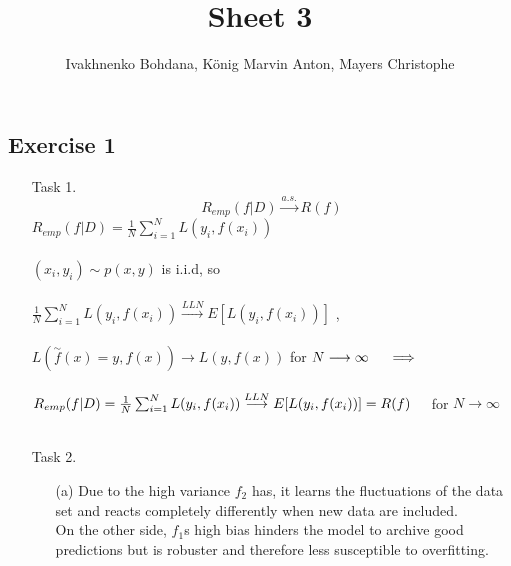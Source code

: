 \documentclass[12pt]{article}
\title{ Sheet 3 }
\author{Ivakhnenko Bohdana, König Marvin Anton, Mayers Christophe}
\begin{document}
\maketitle

\vspace{0.5in}



\subsection*{Exercise 1}
\begin{itemize}

\item[Task 1.] 
\[
R_{emp}(f|D) \overset{a. s.}{\longrightarrow} R(f)
\]
$R_{emp}(f|D) = \frac{1}{N} \sum_{i=1}^NL(y_i, f(x_i))$\\\\
$(x_i,y_i)\sim p(x,y)$ is i.i.d, so\\\\
$\frac{1}{N}\sum_{i=1}^NL(y_i, f(x_i))\overset{LLN}{\longrightarrow}E[L(y_i, f(x_i))]$ ,\\\\  $L(\overset{\sim}{f}(x) = y, f(x)) \longrightarrow L(y, f(x))$ \hspace{0.5cm}for $N \longrightarrow \infty \hspace{0.5cm} \Longrightarrow$ \\\\
$R_{emp}(f|D) = \frac{1}{N} \sum_{i=1}^NL(y_i, f(x_i)) \overset{LLN}{\longrightarrow} E[L(y_i, f(x_i))] = R(f) \hspace{0.5cm} $for $ N \longrightarrow \infty $
\\\\
\item[Task 2.] 
\begin{itemize}
\item[(a)] Due to the high variance $f_2$ has, it learns the fluctuations of the data set and reacts completely differently when new data are included.\\
On the other side, $f_1$s high bias hinders the model to archive good predictions but is robuster and therefore less susceptible to overfitting.\\


\end{itemize}
\end{itemize}
\end{document}
